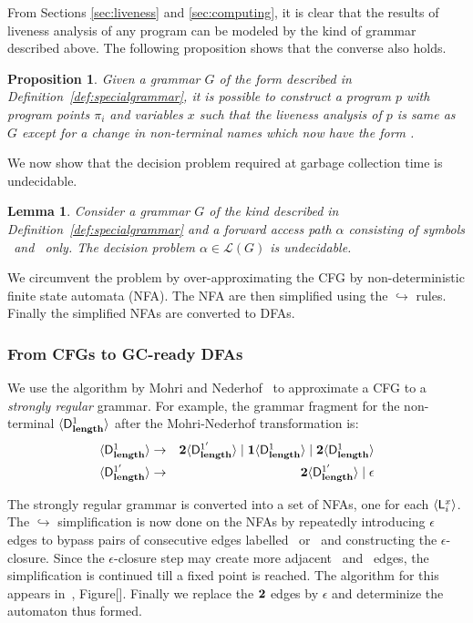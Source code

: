 \documentclass[9pt]{sigplanconf}
\newcommand{\comment}[1]{{\color{Myblue}{(#1)}}}
\newtheorem{proposition}[theorem]{Proposition}
\newtheorem{lemma}[theorem]{Lemma}
\begin{document}
From Sections \ref{sec:liveness}  and \ref{sec:computing}, it is clear
that the results of liveness analysis of any program can be modeled by
the kind  of grammar described above. The  following proposition shows
that the converse also holds.
\begin{proposition}
Given    a     grammar    $G$    of    the     form    described    in
Definition~\ref{def:specialgrammar},  it is  possible  to construct  a
program $p$  with program points  $\pi_i$ and variables $x$  such that
the liveness  analysis of $p$  is same as  $G$ except for a  change in
non-terminal names which now have the form .
\end{proposition}
We now show that the decision problem required at garbage collection
time is undecidable.

\begin{lemma}
Consider a grammar $G$ of the kind  described in
Definition~\ref{def:specialgrammar} and a forward access path $\alpha$
consisting
of symbols \acar\ and \acdr\  only. The decision problem $\alpha \in
\mathscr{L}(G)$ is undecidable.
\end{lemma}

\comment{Proof:}


We circumvent  the problem by over-approximating the  CFG  by
non-deterministic finite state automata (NFA). The NFA are then
simplified using the $\hookrightarrow$ rules. Finally the simplified
NFAs are converted to DFAs.

\subsubsection{From CFGs to GC-ready DFAs}
\label{sec:NFA-approx}
 We use  the algorithm by Mohri  and Nederhof~\cite{mohri00regular} to
 approximate a CFG to a {\em strongly regular\/} grammar.  For
 example, the grammar
 fragment  for  the  non-terminal  $\var{\Df{\length}{1}}$  after  the
 Mohri-Nederhof transformation is:
 \begin{eqnarray*}
   \var{\Df{\length}{1}} &\rightarrow& \clazy\var{\Df{\length}{1'}} \mid
   \acdr\var{\Df{\length}{1}}
   \mid \clazy\var{\Df{\length}{1}}\\
   \var{\Df{\length}{1'}} &\rightarrow& \clazy\var{\Df{\length}{1'}}
   \mid \epsilon
 \end{eqnarray*}

The strongly regular grammar is converted into a set of
NFAs,   one  for   each  $\var{\Lanv{i}{x}}$.   The  $\hookrightarrow$
simplification  is now  done  on the  NFAs  by repeatedly  introducing
$\epsilon$  edges  to  bypass  pairs  of  consecutive  edges  labelled
\bcar\acar\ or \bcdr\acdr\  and constructing the
$\epsilon$-closure. Since the $\epsilon$-closure step may create more
adjacent \bcar\acar\ and \bcdr\acdr\  edges, the simplification is
 continued  till a  fixed point is  reached. The algorithm  for this
appears  in~\cite{asati14lgc},   Figure[].  Finally  we   replace  the
${\mathbf{2}}$  edges  by  $\epsilon$  and determinize  the  automaton  thus
formed.
\end{document}
